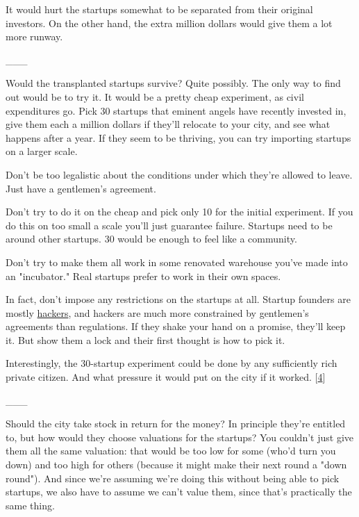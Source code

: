 It would hurt the
                  startups somewhat to be separated from their original
                  investors. On the other hand, the extra million dollars would
                  give them a lot more runway.


                  \_\_\_
                  

Would the transplanted startups survive? Quite
                  possibly. The only way to find out would be to try it. It
                  would be a pretty cheap experiment, as civil expenditures go.
                  Pick 30 startups that eminent angels have recently invested
                  in, give them each a million dollars if they'll relocate to
                  your city, and see what happens after a year. If they seem to
                  be thriving, you can try importing startups on a larger
                  scale.

Don't be too legalistic about the conditions
                  under which they're allowed to leave. Just have a gentlemen's
                  agreement.

Don't try to do it on the cheap and pick
                  only 10 for the initial experiment. If you do this on too
                  small a scale you'll just guarantee failure. Startups need to
                  be around other startups. 30 would be enough to feel like a
                  community.

Don't try to make them all work in some
                  renovated warehouse you've made into an "incubator." Real
                  startups prefer to work in their own spaces.

In
                  fact, don't impose any restrictions on the startups at all.
                  Startup founders are mostly \href{http://www.paulgraham.com/gba.html}{hackers},
                  and hackers are much more constrained by gentlemen's
                  agreements than regulations. If they shake your hand on a
                  promise, they'll keep it. But show them a lock and their first
                  thought is how to pick it.

Interestingly, the
                  30-startup experiment could be done by any sufficiently rich
                  private citizen. And what pressure it would put on the city if
                  it worked.
                  [\href{\#f4n}{4}]


                  \_\_\_
                  

Should the city take stock in return for the
                  money? In principle they're entitled to, but how would they
                  choose valuations for the startups? You couldn't just give
                  them all the same valuation: that would be too low for some
                  (who'd turn you down) and too high for others (because it
                  might make their next round a "down round"). And since we're
                  assuming we're doing this without being able to pick startups,
                  we also have to assume we can't value them, since that's
                  practically the same thing.

